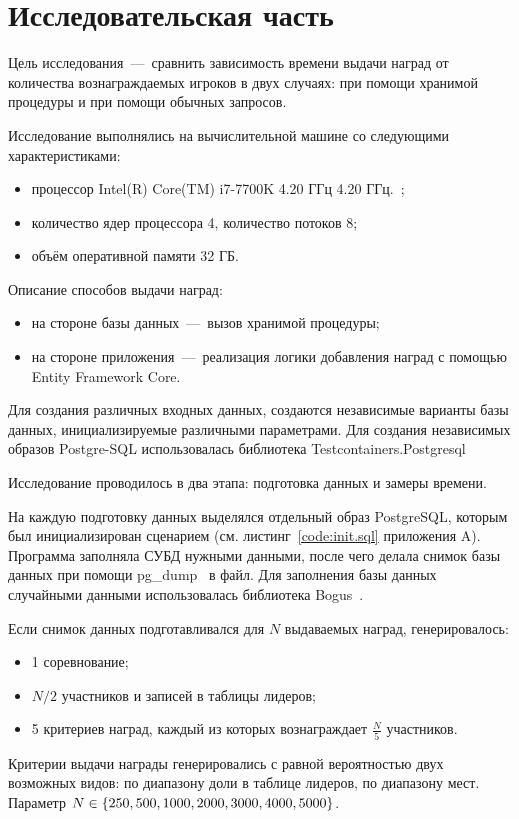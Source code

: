 \chapter{Исследовательская часть}
Цель исследования~---~сравнить зависимость времени выдачи наград от количества вознаграждаемых игроков в двух случаях: при помощи хранимой процедуры и при помощи обычных запросов.

Исследование выполнялись на вычислительной машине со следующими характеристиками:
\begin{itemize}
	\item процессор Intel(R) Core(TM) i7-7700K 4.20 ГГц 4.20 ГГц.~\cite{intel};
	\item количество ядер процессора 4, количество потоков 8;
	\item объём оперативной памяти 32 ГБ.
\end{itemize}

Описание способов выдачи наград:
\begin{itemize}
	\item на стороне базы данных~---~вызов хранимой процедуры;
	\item на стороне приложения~---~реализация логики добавления наград с помощью Entity Framework Core.
\end{itemize}

Для создания различных входных данных, создаются независимые варианты базы данных, инициализируемые различными параметрами. Для создания независимых образов Postgre-SQL использовалась библиотека Testcontainers.Postgresql~\cite{testcontainers}

Исследование проводилось в два этапа: подготовка данных и замеры времени.

На каждую подготовку данных выделялся отдельный образ PostgreSQL, которым был инициализирован сценарием (см. листинг~\ref{code:init.sql} приложения A). Программа заполняла СУБД нужными данными, после чего делала снимок базы данных при помощи pg\_dump~\cite{postgresql_pgdump} в файл. Для заполнения базы данных случайными данными использовалась библиотека Bogus~\cite{bogus}.

Если снимок данных подготавливался для $N$ выдаваемых наград, генерировалось:
\begin{itemize}
	\item 1 соревнование;
	\item $N/2$ участников и записей в таблицы лидеров;
	\item 5 критериев наград, каждый из которых вознаграждает $\frac{N}{5}$ участников.
\end{itemize}
Критерии выдачи награды генерировались с равной вероятностью двух возможных видов: по диапазону доли в таблице лидеров, по диапазону мест. Параметр $N \in \{250, 500, 1000, 2000,\\ 3000, 4000, 5000\}$.

